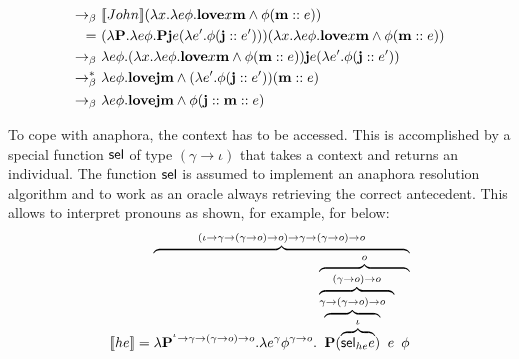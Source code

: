\begin{example}
\begin{align}
\bconv \ &    \I{John}( \lambda \x1.  \lambda e \phi.  \textbf{love} \x1 \textbf{m} \land  \phi (\upii{\textbf{m}}{e} ))   \notag \\
= \ &    ( \lambda \P2. \lambda e \phi. \P2 \textbf{j} e (\lambda e' .\phi (\upii{\textbf{j}}{e'})))( \lambda \x1.  \lambda e \phi.  \textbf{love} \x1 \textbf{m} \land  \phi (\upii{\textbf{m}}{e} ))   \notag \\
\bconv \ &    \lambda e \phi. ( \lambda \x1.  \lambda e \phi.  \textbf{love} \x1 \textbf{m} \land  \phi (\upii{\textbf{m}}{e} ))   \textbf{j} e (\lambda e' . \phi (\upii{\textbf{j}}{e'})) \notag \\
\bred \ &    \lambda e \phi.  \textbf{love}  \textbf{j} \textbf{m} \land   (\lambda e' .\phi (\upii{\textbf{j}}{e'})) (\upii{\textbf{m}}{e} )  \notag \\
\bconv \ &    \lambda e \phi.  \textbf{love}  \textbf{j} \textbf{m} \land   \phi (\upii{\textbf{j}}{\upii{\textbf{m}}{e} })   \label{eq:2006:JohnLovesMary} 
\end{align}
\end{example}

To cope with anaphora, the context has to be accessed. This is accomplished by a special function $\mathsf{sel}$ of type $(\gamma \rightarrow \iota)$ that takes a context and returns an individual. The function $\mathsf{sel}$ is assumed to implement an anaphora resolution algorithm and to work as an oracle always retrieving the correct antecedent. This allows to interpret pronouns as shown, for example, for  below:
\begin{align}
\I{he} =  \overbrace{\lambda \P2^{^\iota \rightarrow \gamma \rightarrow (\gamma \rightarrow o) \rightarrow o}. \lambda e^{\gamma} \phi^{\gamma \rightarrow o}. \overbrace{\overbrace{\overbrace{\P2 ( \overbrace{\sel_{he} e}^{\iota} )}^{\gamma \rightarrow (\gamma \rightarrow o) \rightarrow o} e}^{ (\gamma \rightarrow o) \rightarrow o} \ \phi }^{o}}^{(\iota \rightarrow \gamma \rightarrow (\gamma \rightarrow o) \rightarrow o) \rightarrow \gamma \rightarrow (\gamma \rightarrow o) \rightarrow o}  \label{eq:he:2006}
\end{align}

